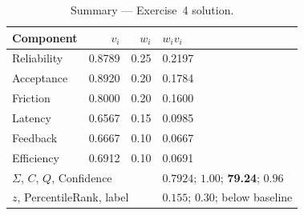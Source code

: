 \documentclass[11pt,a4paper]{article}
\begin{document}
\begin{table}[h!]
\centering
\caption{Summary --- Exercise~4 solution.}
\begin{tabular}{@{}lrrl@{}}
\toprule
Component & $v_i$ & $w_i$ & $w_iv_i$ \\
\midrule
Reliability  & 0.8789 & 0.25 & 0.2197 \\
Acceptance   & 0.8920 & 0.20 & 0.1784 \\
Friction     & 0.8000 & 0.20 & 0.1600 \\
Latency      & 0.6567 & 0.15 & 0.0985 \\
Feedback     & 0.6667 & 0.10 & 0.0667 \\
Efficiency   & 0.6912 & 0.10 & 0.0691 \\
\midrule
\multicolumn{3}{l}{$\Sigma$, $C$, $Q$, Confidence}
  & $0.7924$;\; $1.00$;\; \textbf{79.24};\; $0.96$ \\
\multicolumn{3}{l}{$z$, PercentileRank, label}
  & $0.155$;\; $0.30$;\; below baseline \\
\bottomrule
\end{tabular}
\end{table}
\end{document}
